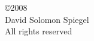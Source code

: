 \vspace*{6in}
\thispagestyle{empty}
\noindent
\setlength{\baselineskip}{0.625 \baselineskip}
\begin{center}
  \copyright 2008 \\
  \vspace{0.05in}
  David Solomon Spiegel \\
  All rights reserved
\end{center}
\setlength{\baselineskip}{1.6 \baselineskip}


\clearpage
